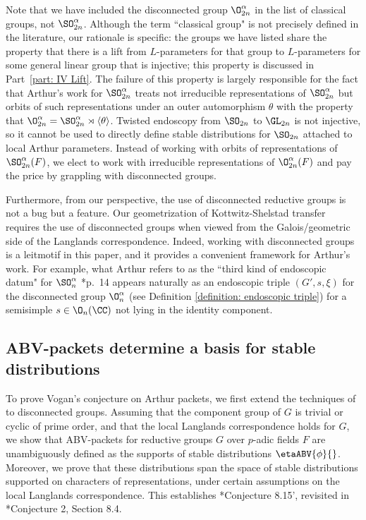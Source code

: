 \documentclass[11pt,letterpaper]{amsart}
\numberwithin{equation}{section}
\begin{document}
Note that we have included the disconnected group $\O^\alpha_{2n}$ in the list of classical groups, not $\SO^\alpha_{2n}$. Although the term ``classical group" is not precisely defined in the literature, our rationale is specific: the groups we have listed share the property that there is a lift from $L$-parameters for that group to $L$-parameters for some general linear group that is injective; this property is discussed in Part~\ref{part: IV Lift}.
The failure of this property is largely responsible for the fact that Arthur's work for $\SO^\alpha_{2n}$ treats not irreducible representations of $\SO^\alpha_{2n}$ but orbits of such representations under an outer automorphism $\theta$ with the property that $\O^{\alpha}_{2n} = \SO^\alpha_{2n}\rtimes\langle\theta\rangle$.
Twisted endoscopy from $\SO_{2n}$ to $\GL_{2n}$ is not injective, so it cannot be used to directly define stable distributions for $\SO_{2n}$ attached to local Arthur parameters. 
Instead of working with orbits of representations of $\SO^\alpha_{2n}(F)$, we elect to work with irreducible representations of $\O^\alpha_{2n}(F)$ and pay the price by grappling with disconnected groups. 

Furthermore, from our perspective, the use of disconnected reductive groups is not a bug but a feature. Our geometrization of Kottwitz-Shelstad transfer requires the use of disconnected groups when viewed from the Galois/geometric side of the Langlands correspondence.
Indeed, working with disconnected groups is a leitmotif in this paper, and it provides a convenient framework for Arthur's work. 
For example, what Arthur refers to as the ``third kind of endoscopic datum" for $\SO^\alpha_n$ \cite{Art13}*{p.~14} appears naturally as an endoscopic triple $(G',s,\xi)$ for the disconnected group $\O^\alpha_n$ (see Definition \ref{definition: endoscopic triple}) for a semisimple $s\in \O_n(\CC)$ not lying in the identity component. 



\subsection{ABV-packets determine a basis for stable distributions}


To prove Vogan’s conjecture on Arthur packets, we first extend the techniques of \cites{CFMMX22,Vog93} to disconnected groups. Assuming that the component group of $G$ is trivial or cyclic of prime order, and that the local Langlands correspondence holds for $G$, we show that ABV-packets for reductive groups $G$ over $p$-adic fields $F$ are unambiguously defined as the supports of stable distributions $\etaABV{\phi}{}$. Moreover, we prove that these distributions span the space of stable distributions supported on characters of representations, under certain assumptions on the local Langlands correspondence. This establishes \cite{Vog93}*{Conjecture 8.15'}, revisited in \cite{CFMMX22}*{Conjecture 2, Section 8.4}.
\end{document}
